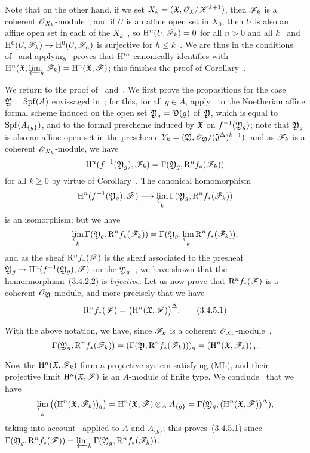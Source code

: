 Note that on the other hand, if we set $X_k=(\mathfrak{X},\mathscr{O}_\mathfrak{X}/\mathscr{K}^{k+1})$, then $\mathscr{F}_k$ is a coherent $\mathscr{O}_{X_k}$-module~, and if $U$ is an affine open set in $X_0$, then $U$ is also an affine open set in each of the $X_k$~, so $\mathrm{H}^n(U,\mathscr{F}_k)=0$ for all $n>0$ and all $k$~ and $\HH^0(U,\sh{F}_k)\to\HH^0(U,\sh{F}_h)$ is surjective for $h\leq k$~.
We are thus in the conditions of~ and applying~ proves that $\mathrm{H}^{\prime n}$ canonically identifies with $\mathrm{H}^n(\mathfrak{X},\varprojlim_k\mathscr{F}_k)=\mathrm{H}^n(\mathfrak{X},\mathscr{F})$; this finishes the proof of Corollary~.

\begin{env}[3.4.5]
\label{3.3.4.5}
We return to the proof of~ and~.
We first prove the propositions for the case $\mathfrak{Y}={\mathop{\mathrm{Spf}}\nolimits}(A)$ envissaged in~; for this, for all $g\in A$, apply~ to the Noetherian affine formal scheme induced on the open set $\mathfrak{Y}_g=\mathfrak{D}(g)$ of $\mathfrak{Y}$, which is equal to ${\mathop{\mathrm{Spf}}\nolimits}(A_{\{g\}})$, and to the formal prescheme induced by $\mathfrak{X}$ on $f^{-1}(\mathfrak{Y}_g)$; note that $\mathfrak{Y}_g$ is also an affine open set in the prescheme $Y_k=(\mathfrak{Y},\mathscr{O}_\mathfrak{Y}/(\mathfrak{J}^\Delta)^{k+1})$, and as $\mathscr{F}_k$ is a coherent $\mathscr{O}_{X_k}$-module, we have
\[
  \mathrm{H}^n(f^{-1}(\mathfrak{Y}_g),\mathscr{F}_k)=\Gamma(\mathfrak{Y}_g,\mathrm{R}^n f_*(\mathscr{F}_k))
\]
for all $k\geq 0$ by virtue of Corollary~.
The canonical homomorphism
\[
  \HH^n(f^{-1}(\fk{Y}_g),\sh{F})\to\varprojlim_k\Gamma(\fk{Y}_g,\RR^n f_*(\sh{F}_k))
\]
is an isomorphism; but we have~
\[
  \varprojlim_k\Gamma(\mathfrak{Y}_g,\mathrm{R}^n f_*(\mathscr{F}_k))=\Gamma(\mathfrak{Y}_g,\varprojlim_k\mathrm{R}^n f_*(\mathscr{F}_k)),
\]
and as the sheaf $\mathrm{R}^n f_*(\mathscr{F})$ is the sheaf associated to the presheaf $\fk{Y}_g\mapsto\HH^n(f^{-1}(\fk{Y}_g),\sh{F})$ on the $\mathfrak{Y}_g$~, we have shown that the homormorphism~(3.4.2.2) is \emph{bijective}.
Let us now prove that $\mathrm{R}^n f_*(\mathscr{F})$ is a coherent $\mathscr{O}_\mathfrak{Y}$-module, and more precisely that we have
\[
\label{3.3.4.5.1}
  \mathrm{R}^n f_*(\mathscr{F})=\big(\mathrm{H}^n(\mathfrak{X},\mathscr{F})\big)^\Delta.
  \tag{3.4.5.1}
\]

With the above notation, we have, since $\mathscr{F}_k$ is a coherent $\mathscr{O}_{X_k}$-module~,
\[
  \Gamma(\mathfrak{Y}_g,\mathrm{R}^n f_*(\mathscr{F}_k))=(\Gamma(\mathfrak{Y},\mathrm{R}^n f_*(\mathscr{F}_k)))_g=(\mathrm{H}^n(\mathfrak{X},\mathscr{F}_k))_g.
\]

Now the $\mathrm{H}^n(\mathfrak{X},\mathscr{F}_k)$ form a projective system satisfying (ML), and their projective limit $\mathrm{H}^n(\mathfrak{X},\mathscr{F})$ is an $A$-module of finite type.
We conclude~ that we have
\[
  \varprojlim_k\big((\mathrm{H}^n(\mathfrak{X},\mathscr{F}_k))_g\big)=\mathrm{H}^n(\mathfrak{X},\mathscr{F})\otimes_A A_{\{g\}}=\Gamma(\mathfrak{Y}_g,(\mathrm{H}^n(\mathfrak{X},\mathscr{F}))^\Delta),
\]
taking into account~ applied to $A$ and $A_{\{g\}}$; this proves~(3.4.5.1) since $\Gamma(\mathfrak{Y}_g,\mathrm{R}^n f_*(\mathscr{F}))=\varprojlim_k\Gamma(\mathfrak{Y}_g,\mathrm{R}^n f_*(\mathscr{F}_k))$.


\end{env}

